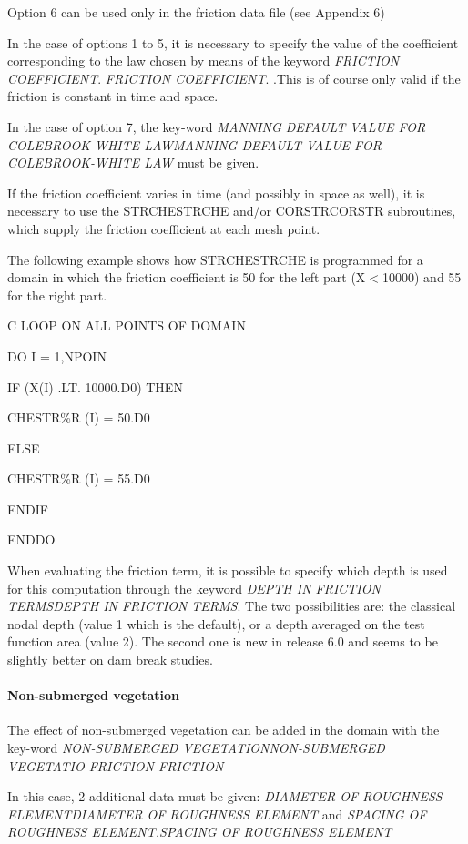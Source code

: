 \documentclass{article} %
\begin{document}
 Option 6 can be used only in the friction data file (see Appendix 6)

 In the case of options 1 to 5, it is necessary to specify the value of the coefficient corresponding to the law chosen by means of the keyword \textit{FRICTION COEFFICIENT}. \textit{FRICTION COEFFICIENT}. .This is of course only valid if the friction is constant in time and space.

 In the case of option 7, the key-word \textit{MANNING DEFAULT VALUE FOR COLEBROOK-WHITE LAWMANNING DEFAULT VALUE FOR COLEBROOK-WHITE LAW} must be given.

 If the friction coefficient varies in time (and possibly in space as well), it is necessary to use the STRCHESTRCHE and/or CORSTRCORSTR subroutines, which supply the friction coefficient at each mesh point.

 The following example shows how STRCHESTRCHE is programmed for a domain in which the friction coefficient is 50 for the left part (X$<$10000) and 55 for the right part.

 C LOOP ON ALL POINTS OF DOMAIN

  DO I = 1,NPOIN

    IF (X(I) .LT. 10000.D0) THEN

      CHESTR\%R (I) = 50.D0

    ELSE

      CHESTR\%R (I) = 55.D0

    ENDIF

       ENDDO

 When evaluating the friction term, it is possible to specify which depth is used for this computation through the keyword \textit{DEPTH IN FRICTION TERMSDEPTH IN FRICTION TERMS}. The two possibilities are: the classical nodal depth (value 1 which is the default), or a depth averaged on the test function area (value 2). The second one is new in release 6.0 and seems to be slightly better on dam break studies.


\paragraph{ Non-submerged vegetation}

 The effect of non-submerged vegetation can be added in the domain with the key-word \textit{NON-SUBMERGED VEGETATIONNON-SUBMERGED VEGETATIO FRICTION FRICTION}

 In this case, 2 additional data must be given: \textit{DIAMETER OF ROUGHNESS ELEMENTDIAMETER OF ROUGHNESS ELEMENT }and \textit{SPACING OF ROUGHNESS ELEMENT.SPACING OF ROUGHNESS ELEMENT}
\end{document}
